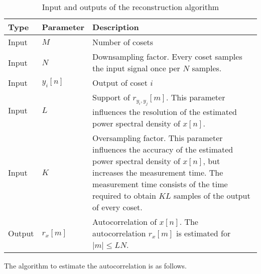 \documentclass[a4paper, openany, oneside]{memoir}
\begin{document}
\begin{table}
    \centering
    \begin{tabularx}{\textwidth}{llY}
        \textbf{Type} & \textbf{Parameter} & \textbf{Description} \\ \hline
        Input & $M$ & Number of cosets \\
        Input & $N$ & Downsampling factor. Every coset samples the input signal once per $N$ samples. \\
        Input & $y_i[n]$ & Output of coset $i$ \\
        Input & $L$ & Support of $r_{y_i,y_j}[m]$. This parameter influences the resolution of the estimated power spectral density of $x[n]$. \\
        Input & $K$ & Oversampling factor. This parameter influences the accuracy of the estimated power spectral density of $x[n]$, but increases the measurement time. The measurement time consists of the time required to obtain $KL$ samples of the output of every coset. \\
        Output & $r_x[m]$ & Autocorrelation of $x[n]$. The autocorrelation $r_x[m]$ is estimated for $|m| \le LN$.
    \end{tabularx}
    \caption{Input and outputs of the reconstruction algorithm}
    \label{tab:reconstruction-algorithm-inputs-outputs}
\end{table}

The algorithm to estimate the autocorrelation is as follows.
\end{document}
